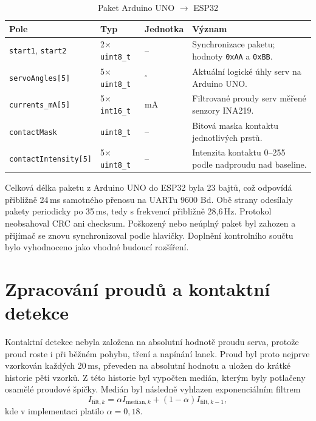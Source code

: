 \begin{table}[H]
\centering
\caption{Paket Arduino UNO $\rightarrow$ ESP32}
\label{tab:packet-uno-esp}
\begin{tabular}{|p{}|p{}|p{}|p{}|}
\hline
\textbf{Pole} & \textbf{Typ} & \textbf{Jednotka} & \textbf{Význam} \\
\hline
\texttt{start1}, \texttt{start2} & 2$\times$ \texttt{uint8\_t} & -- & Synchronizace paketu; hodnoty \texttt{0xAA} a \texttt{0xBB}. \\
\hline
\texttt{servoAngles[5]} & 5$\times$ \texttt{uint8\_t} & $^\circ$ & Aktuální logické úhly serv na Arduino UNO\@. \\
\hline
\texttt{currents\_mA[5]} & 5$\times$ \texttt{int16\_t} & mA & Filtrované proudy serv měřené senzory INA219. \\
\hline
\texttt{contactMask} & \texttt{uint8\_t} & -- & Bitová maska kontaktu jednotlivých prstů. \\
\hline
\texttt{contactIntensity[5]} & 5$\times$ \texttt{uint8\_t} & -- & Intenzita kontaktu 0--255 podle nadproudu nad baseline. \\
\hline
\end{tabular}
\end{table}

Celková délka paketu z Arduino UNO do ESP32 byla 23 bajtů, což odpovídá přibližně 24\,ms samotného přenosu na UARTu 9600 Bd. Obě strany odesílaly pakety periodicky po 35\,ms, tedy s frekvencí přibližně 28,6\,Hz. Protokol neobsahoval CRC ani checksum. Poškozený nebo neúplný paket byl zahozen a přijímač se znovu synchronizoval podle hlavičky. Doplnění kontrolního součtu bylo vyhodnoceno jako vhodné budoucí rozšíření.

\section{Zpracování proudů a kontaktní detekce}
\label{sec:kontaktova-detekce-hardware}

Kontaktní detekce nebyla založena na absolutní hodnotě proudu serva, protože proud roste i při běžném pohybu, tření a napínání lanek. Proud byl proto nejprve vzorkován každých 20\,ms, převeden na absolutní hodnotu a uložen do krátké historie pěti vzorků. Z této historie byl vypočten medián, kterým byly potlačeny osamělé proudové špičky. Medián byl následně vyhlazen exponenciálním filtrem
\begin{equation}
    I_{\mathrm{filt},k} =
    \alpha I_{\mathrm{median},k}
    + \left(1 - \alpha\right)I_{\mathrm{filt},k-1},
\end{equation}
kde v implementaci platilo $\alpha = 0{,}18$.

